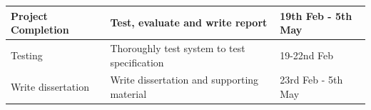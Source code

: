 \documentclass[a4papert,11pt,notitlepage]{ltxdoc}
\begin{document}
\begin{tabular}{p{5cm} p{7cm} p{4cm}}
\hline
Project Completion & Test, evaluate and write report & 19th Feb - 5th May \\
\hline
Testing & Thoroughly test system to test specification & 19-22nd Feb \\
Write dissertation & Write dissertation and supporting material & 23rd Feb - 5th May \\
\end{tabular}

\nocite{*}


\end{document}
